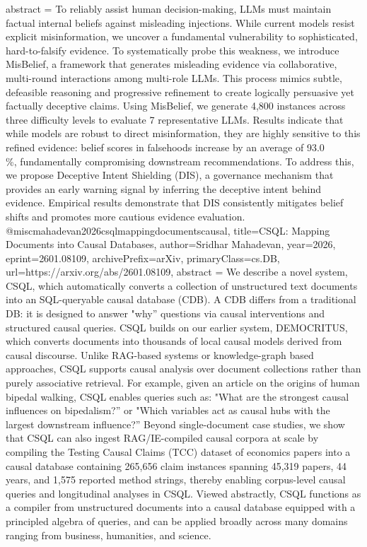{      abstract = {To reliably assist human decision-making, LLMs must maintain factual internal beliefs against misleading injections. While current models resist explicit misinformation, we uncover a fundamental vulnerability to sophisticated, hard-to-falsify evidence. To systematically probe this weakness, we introduce MisBelief, a framework that generates misleading evidence via collaborative, multi-round interactions among multi-role LLMs. This process mimics subtle, defeasible reasoning and progressive refinement to create logically persuasive yet factually deceptive claims. Using MisBelief, we generate 4,800 instances across three difficulty levels to evaluate 7 representative LLMs. Results indicate that while models are robust to direct misinformation, they are highly sensitive to this refined evidence: belief scores in falsehoods increase by an average of 93.0\\\%, fundamentally compromising downstream recommendations. To address this, we propose Deceptive Intent Shielding (DIS), a governance mechanism that provides an early warning signal by inferring the deceptive intent behind evidence. Empirical results demonstrate that DIS consistently mitigates belief shifts and promotes more cautious evidence evaluation.}
}@misc{mahadevan2026csqlmappingdocumentscausal,
      title={CSQL: Mapping Documents into Causal Databases}, 
      author={Sridhar Mahadevan},
      year={2026},
      eprint={2601.08109},
      archivePrefix={arXiv},
      primaryClass={cs.DB},
      url={https://arxiv.org/abs/2601.08109},
      abstract = {We describe a novel system, CSQL, which automatically converts a collection of unstructured text documents into an SQL-queryable causal database (CDB). A CDB differs from a traditional DB: it is designed to answer "why'' questions via causal interventions and structured causal queries. CSQL builds on our earlier system, DEMOCRITUS, which converts documents into thousands of local causal models derived from causal discourse. Unlike RAG-based systems or knowledge-graph based approaches, CSQL supports causal analysis over document collections rather than purely associative retrieval. For example, given an article on the origins of human bipedal walking, CSQL enables queries such as: "What are the strongest causal influences on bipedalism?'' or "Which variables act as causal hubs with the largest downstream influence?'' Beyond single-document case studies, we show that CSQL can also ingest RAG/IE-compiled causal corpora at scale by compiling the Testing Causal Claims (TCC) dataset of economics papers into a causal database containing 265,656 claim instances spanning 45,319 papers, 44 years, and 1,575 reported method strings, thereby enabling corpus-level causal queries and longitudinal analyses in CSQL. Viewed abstractly, CSQL functions as a compiler from unstructured documents into a causal database equipped with a principled algebra of queries, and can be applied broadly across many domains ranging from business, humanities, and science.}
}
